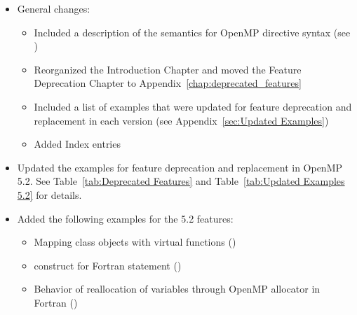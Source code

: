 \begin{itemize}
\item General changes:
\begin{itemize}
\item Included a description of the semantics for OpenMP directive syntax
 (see )
\item Reorganized the Introduction Chapter and moved the Feature 
Deprecation Chapter to Appendix~\ref{chap:deprecated_features}
\item Included a list of examples that were updated for feature deprecation
and replacement in each version (see Appendix~\ref{sec:Updated Examples})
\item Added Index entries
\end{itemize}

\item Updated the examples for feature deprecation and replacement in OpenMP 5.2.
See Table~\ref{tab:Deprecated Features} and 
Table~\ref{tab:Updated Examples 5.2} for details.

\item Added the following examples for the 5.2 features:
\begin{itemize}
  \item Mapping class objects with virtual functions
     ()
  \item {} construct for Fortran  statement
     ()
  \item Behavior of reallocation of variables through OpenMP allocator in
     Fortran ()
\end{itemize}


\end{itemize}
